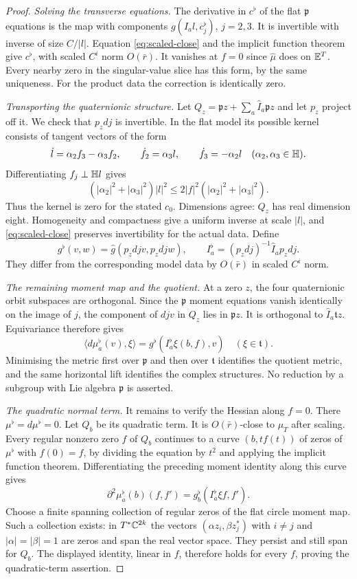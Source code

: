 \begin{proof}
\emph{Solving the transverse equations.}
The derivative in $c^\flat$ of the flat $\mathfrak p$ equations
is the map with components $g(I_al,c_j^\flat)$, $j=2,3$.
It is invertible with inverse of size $C/|l|$. Equation
\eqref{eq:scaled-close} and the implicit function theorem give
$c^\flat$, with scaled $C^i$ norm $O(\bar r)$.
It vanishes at $f=0$ since $\widehat\mu$ does on $\mathbb E^T$.
Every nearby zero in the singular-value slice has this form,
by the same uniqueness. For the product data the correction is
identically zero.

\emph{Transporting the quaternionic structure.}
Let $Q_z=\mathfrak pz+\sum_a\widehat I_a\mathfrak pz$
and let $p_z$ project off it. We check that $p_zdj$ is
invertible. In the flat model its possible kernel consists of
tangent vectors of the form
\[
 \dot l=\alpha_2f_3-\alpha_3f_2,\qquad
 \dot f_2=\alpha_3l,\qquad \dot f_3=-\alpha_2l
 \quad(\alpha_2,\alpha_3\in\mathbb H).
\]
Differentiating $f_j\perp\mathbb H l$ gives
\[
 (|\alpha_2|^2+|\alpha_3|^2)|l|^2
 \le2|f|^2(|\alpha_2|^2+|\alpha_3|^2).
\]
Thus the kernel is zero for the stated $c_0$. Dimensions agree:
$Q_z$ has real dimension eight. Homogeneity and compactness
give a uniform inverse at scale $|l|$, and
\eqref{eq:scaled-close} preserves invertibility for the actual
data. Define
\[
 g^\flat(v,w)=\widehat g(p_zdjv,p_zdjw),\qquad
 I_a^\flat=(p_zdj)^{-1}\widehat I_a p_zdj.
\]
They differ from the corresponding model data by
$O(\bar r)$ in scaled $C^i$ norm.

\emph{The remaining moment map and the quotient.}
At a zero $z$, the four quaternionic orbit subspaces are
orthogonal. Since the $\mathfrak p$ moment equations vanish
identically on the image of $j$, the component of $djv$ in
$Q_z$ lies in $\mathfrak pz$. It is orthogonal to
$\widehat I_a\mathfrak tz$. Equivariance therefore gives
\[
 \langle d\mu_a^\flat(v),\xi\rangle
 =g^\flat(I_a^\flat\xi(b,f),v)\quad(\xi\in\mathfrak t).
\]
Minimising the metric first over $\mathfrak p$ and then over
$\mathfrak t$ identifies the quotient metric, and the same
horizontal lift identifies the complex structures. No reduction
by a subgroup with Lie algebra $\mathfrak p$ is asserted.

\emph{The quadratic normal term.}
It remains to verify the Hessian along $f=0$. There
$\mu^\flat=d\mu^\flat=0$. Let $Q_b$ be its quadratic term.
It is $O(\bar r)$-close to $\mu_T$ after scaling. Every
regular nonzero zero $f$ of $Q_b$ continues to a curve
$(b,tf(t))$ of zeros of $\mu^\flat$ with $f(0)=f$, by
dividing the equation by $t^2$ and applying the implicit function
theorem. Differentiating the preceding moment identity along
this curve gives
\[
 \partial^2\mu_a^\flat(b)(f,f')
 =g_b^\flat(I_a^\flat\xi f,f').
\]
Choose a finite spanning collection of regular zeros of the flat
circle moment map. Such a collection exists: in $T^*\mathbb C^{2k}$
the vectors $(\alpha z_i,\beta z_j^*)$ with $i\ne j$ and
$|\alpha|=|\beta|=1$ are zeros and span the real vector space.
They persist and still span for $Q_b$. The displayed identity,
linear in $f$, therefore holds for every $f$, proving the
quadratic-term assertion.
\end{proof}

